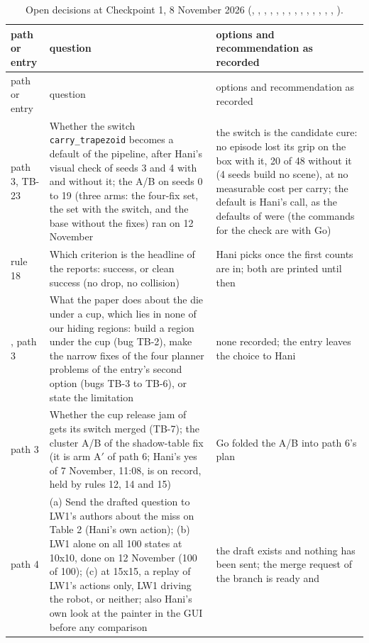 \begin{small}
\begin{longtable}{@{}P{2.1cm}P{5.9cm}P{6.0cm}@{}}
\caption[Open decisions at Checkpoint 1.]{Open decisions at Checkpoint 1, 8 November
2026 (, , , , , , , , ,
, , , , , ).}\label{tab:pending}\\
\toprule
path or entry & question & options and recommendation as recorded \\
\midrule
\endfirsthead
\toprule
path or entry & question & options and recommendation as recorded \\
\midrule
\endhead
\bottomrule
\endfoot
path 3, TB-23 &
Whether the switch \texttt{carry\_trapezoid} becomes a default of the pipeline, after
Hani's visual check of seeds 3 and 4 with and without it; the A/B on seeds 0 to 19 (three
arms: the four-fix set, the set with the switch, and the base without the fixes) ran on
12 November &
the switch is the candidate cure: no episode lost its grip on the box with it, 20 of 48
without it (4 seeds build no scene), at no measurable cost per carry; the default is Hani's call, as the defaults
of  were (the commands for the check are with Go) \\
rule 18 &
Which criterion is the headline of the reports: success, or clean success (no drop, no
collision) &
Hani picks once the first counts are in; both are printed until then \\
, path 3 &
What the paper does about the die under a cup, which lies in none of our hiding
regions: build a region under the cup (bug TB-2), make the narrow fixes of the four
planner problems of the entry's second option (bugs TB-3 to TB-6), or state the
limitation &
none recorded; the entry leaves the choice to Hani \\
path 3 &
Whether the cup release jam of  gets its switch merged (TB-7); the cluster A/B
of the shadow-table fix (it is arm A$'$ of path 6; Hani's yes of 7 November, 11:08,
is on record, held by rules 12, 14 and 15) &
Go folded the A/B into path 6's plan \\
path 4 &
(a) Send the drafted question to LW1's authors about the miss on Table 2 (Hani's own
action); (b) LW1 alone on all 100 states at 10x10, done on 12 November (100 of 100); (c) at
15x15, a replay of LW1's actions only, LW1 driving the robot, or neither; also Hani's own
look at the painter in the GUI before any comparison &
the draft exists and nothing has been sent; the merge request of the branch is ready and

\end{longtable}
\end{small}
